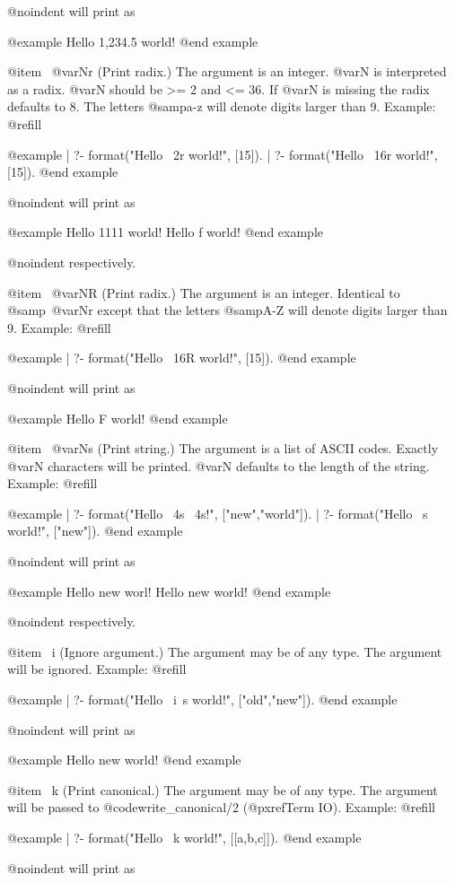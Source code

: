 @noindent
will print as

@example
Hello 1,234.5 world!
@end example

@item ~@var{N}r
(Print radix.) The argument is an integer. @var{N} is interpreted as a radix.
@var{N} should be >= 2 and <= 36.  If @var{N} is missing the radix defaults to
8.  The letters @samp{a-z} will denote digits larger than 9.  Example: @refill

@example
| ?- format("Hello ~2r world!", [15]).
| ?- format("Hello ~16r world!", [15]).
@end example

@noindent
will print as

@example
Hello 1111 world!
Hello f world!
@end example

@noindent
respectively.

@item ~@var{N}R
(Print radix.) The argument is an integer.  Identical to @samp{~@var{N}r} except
that the letters @samp{A-Z} will denote digits larger than 9.  Example: @refill

@example
| ?- format("Hello ~16R world!", [15]).
@end example

@noindent
will print as

@example
Hello F world!
@end example

@item ~@var{N}s
(Print string.) The argument is a list of ASCII codes.  Exactly @var{N}
characters will be printed. @var{N} defaults to the length of the string.
Example: @refill

@example
| ?- format("Hello ~4s ~4s!", ["new","world"]).
| ?- format("Hello ~s world!", ["new"]).
@end example

@noindent
will print as

@example
Hello new  worl!
Hello new world!
@end example

@noindent
respectively.

@item ~i
(Ignore argument.) The argument may be of any type.  The argument will be
ignored.  Example: @refill

@example
| ?- format("Hello ~i~s world!", ["old","new"]).
@end example

@noindent
will print as

@example
Hello new world!
@end example

@item ~k
(Print canonical.) The argument may be of any type.  The argument will be
passed to @code{write_canonical/2} (@pxref{Term IO}).  Example: @refill

@example
| ?- format("Hello ~k world!", [[a,b,c]]).
@end example

@noindent
will print as

